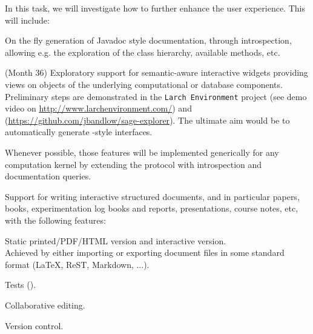 \begin{workpackage}
\begin{tasklist}
\begin{task}[id=dynamic-inspect,title=Dynamic documentation and exploration system]
  In this task, we will investigate how to further enhance the user
  experience. This will include:
  \begin{compactitem}
  \item On the fly generation of Javadoc style documentation, through
    introspection, allowing e.g. the exploration of the class
    hierarchy, available methods, etc.
  \item {}
  \item {} (Month 36)
    Exploratory support for semantic-aware interactive widgets
    providing views on objects of the underlying computational or
    database components. Preliminary steps are demonstrated in the
    \texttt{Larch Environment} project (see demo video on
    \url{http://www.larchenvironment.com/}) and
    (\url{https://github.com/jbandlow/sage-explorer}). The ultimate
    aim would be to automatically generate \LMFDB-style interfaces.
  \end{compactitem}
  Whenever possible, those features will be implemented generically
  for any computation kernel by extending the \Jupyter protocol with
  introspection and documentation queries.
\end{task}

\begin{task}[title=Structured documents,id=structdocs]
  Support for writing interactive structured documents, and in
  particular papers, books, experimentation log books and reports,
  presentations, course notes, etc, with the following features:
  \begin{compactitem}
  \item Static printed/PDF/HTML version and interactive version.\\
    Achieved by either importing or exporting document files in some
    standard format (LaTeX, ReST, Markdown, ...).
  \item Tests ().
  \item Collaborative editing.
  \item Version control.
  \end{compactitem}
\end{task}



\end{tasklist}
\end{workpackage}
